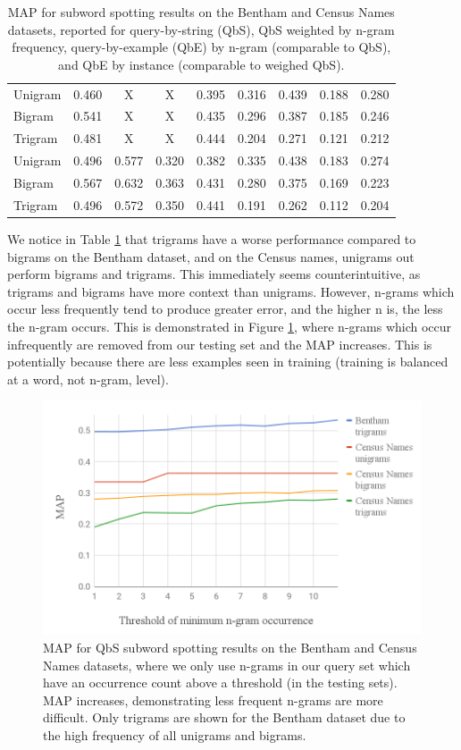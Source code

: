 \documentclass[ms,electronic,twosidetoc,letterpaper,chaptercenter,parttop,lol,lof,lot]{byumsphd}
\begin{document}
\begin{table}
\begin{tabular}{| l | c c c c | c c c c |}
  Unigram & 0.460 & X & X & 0.395  & 0.316 & 0.439 & 0.188 & 0.280\\ %
  Bigram  & 0.541 & X & X & 0.435  & 0.296 & 0.387 & 0.185 & 0.246\\ 
  Trigram & 0.481 & X & X & 0.444  & 0.204 & 0.271 & 0.121 & 0.212\\ 
  \hline %
  Unigram & 0.496 & 0.577 & 0.320 & 0.382  & 0.335 & 0.438 & 0.183 & 0.274\\
  Bigram  & 0.567 & 0.632 & 0.363 & 0.431  & 0.280 & 0.375 & 0.169 & 0.223\\ 
  Trigram & 0.496 & 0.572 & 0.350 & 0.441  & 0.191 & 0.262 & 0.112 & 0.204\\ 
  \hline 
\end{tabular}
\caption{MAP for subword spotting results on the Bentham and Census Names datasets, reported for query-by-string (QbS), QbS weighted by n-gram frequency, query-by-example (QbE) by n-gram (comparable to QbS), and QbE by instance (comparable to weighed QbS).}
\label{tab:subwordspotting}
\end{table}

We notice in Table \ref{tab:subwordspotting} that trigrams have a worse performance compared to bigrams on the Bentham dataset, and on the Census names, unigrams out perform bigrams and trigrams. This immediately seems counterintuitive, as trigrams and bigrams have more context than unigrams. However, n-grams which occur less frequently tend to produce greater error, and the higher n is, the less the n-gram occurs. 
This is demonstrated in Figure \ref{fig:remove}, where n-grams which occur infrequently are removed from our testing set and the MAP increases. This is potentially because there are less examples seen in training (training is balanced at a word, not n-gram, level).


\begin{figure}
    \centering
    \includegraphics[width=.75\textwidth]{removengrams}
    \caption{MAP for QbS subword spotting results on the Bentham and Census Names datasets, where we only use n-grams in our query set which have an occurrence count above a threshold (in the testing sets). MAP increases, demonstrating less frequent n-grams are more difficult. Only trigrams are shown for the Bentham dataset due to the high frequency of all unigrams and bigrams.}
    \label{fig:remove}
\end{figure}
\end{document}
